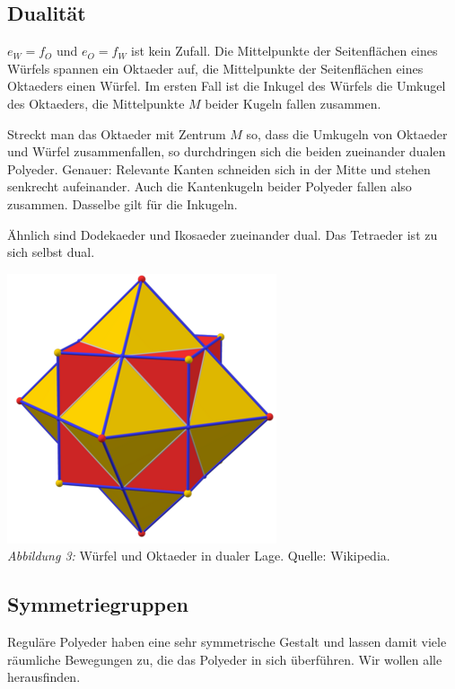 \documentclass[11pt]{article}
\begin{document}
\subsection*{Dualität}

$e_W=f_O$ und $e_O=f_W$ ist kein Zufall. Die Mittelpunkte der Seitenflächen
eines Würfels spannen ein Oktaeder auf, die Mittelpunkte der Seitenflächen
eines Oktaeders einen Würfel. Im ersten Fall ist die Inkugel des Würfels die
Umkugel des Oktaeders, die Mittelpunkte $M$ beider Kugeln fallen zusammen.

\begin{minipage}{.5\textwidth}
  Streckt man das Oktaeder mit Zentrum $M$ so, dass die Umkugeln von Oktaeder
  und Würfel zusammenfallen, so durchdringen sich die beiden zueinander dualen
  Polyeder. Genauer: Relevante Kanten schneiden sich in der Mitte und stehen
  senkrecht aufeinander.  Auch die Kantenkugeln beider Polyeder fallen also
  zusammen. Dasselbe gilt für die Inkugeln.

  Ähnlich sind Dodekaeder und Ikosaeder zueinander dual.  Das Tetraeder ist zu
  sich selbst dual.
\end{minipage}\hfill
\begin{minipage}{.4\textwidth}\centering
  \includegraphics[width=.6\textwidth]{graebe-05-1/Polyhedron_pair_6-8.png}\\
  \emph{Abbildung 3:} Würfel und Oktaeder in dualer Lage. Quelle:
  Wikipedia. 
\end{minipage}

\subsection*{Symmetriegruppen}

Reguläre Polyeder haben eine sehr symmetrische Gestalt und lassen damit viele
räumliche Bewegungen zu, die das Polyeder in sich überführen. Wir wollen alle
herausfinden.  
\end{document}
